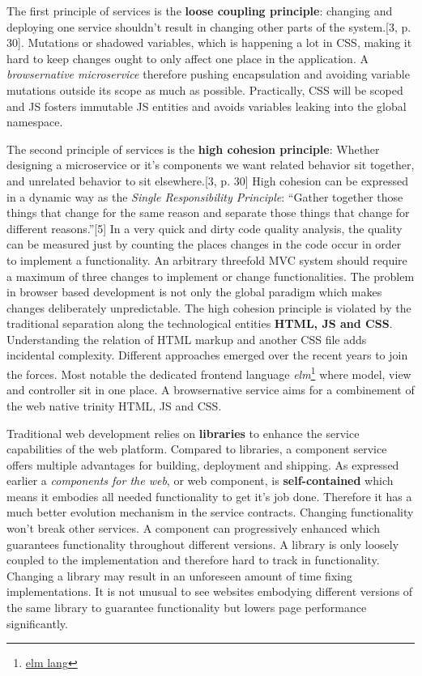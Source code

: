 \documentclass[]{article}
\begin{document}
The first principle of services is the \textbf{loose coupling
principle}: changing and deploying one service shouldn't result in
changing other parts of the system.{[}3, p. 30{]}. Mutations or shadowed
variables, which is happening a lot in CSS, making it hard to keep
changes ought to only affect one place in the application. A
\emph{browsernative microservice} therefore pushing encapsulation and
avoiding variable mutations outside its scope as much as possible.
Practically, CSS will be scoped and JS fosters immutable JS entities and
avoids variables leaking into the global namespace.

The second principle of services is the \textbf{high cohesion
principle}: Whether designing a microservice or it's components we want
related behavior sit together, and unrelated behavior to sit
elsewhere.{[}3, p. 30{]} High cohesion can be expressed in a dynamic way
as the \emph{Single Responsibility Principle}: ``Gather together those
things that change for the same reason and separate those things that
change for different reasons.''{[}5{]} In a very quick and dirty code
quality analysis, the quality can be measured just by counting the
places changes in the code occur in order to implement a functionality.
An arbitrary threefold MVC system should require a maximum of three
changes to implement or change functionalities. The problem in browser
based development is not only the global paradigm which makes changes
deliberately unpredictable. The high cohesion principle is violated by
the traditional separation along the technological entities
\textbf{HTML, JS and CSS}. Understanding the relation of HTML markup and
another CSS file adds incidental complexity. Different approaches
emerged over the recent years to join the forces. Most notable the
dedicated frontend language \emph{elm}\footnote{\href{http://elm-lang.org/}{elm
  lang}} where model, view and controller sit in one place. A
browsernative service aims for a combinement of the web native trinity
HTML, JS and CSS.

Traditional web development relies on \textbf{libraries} to enhance the
service capabilities of the web platform. Compared to libraries, a
component service offers multiple advantages for building, deployment
and shipping. As expressed earlier a \emph{components for the web}, or
web component, is \textbf{self-contained} which means it embodies all
needed functionality to get it's job done. Therefore it has a much
better evolution mechanism in the service contracts. Changing
functionality won't break other services. A component can progressively
enhanced which guarantees functionality throughout different versions. A
library is only loosely coupled to the implementation and therefore hard
to track in functionality. Changing a library may result in an
unforeseen amount of time fixing implementations. It is not unusual to
see websites embodying different versions of the same library to
guarantee functionality but lowers page performance significantly.
\end{document}
